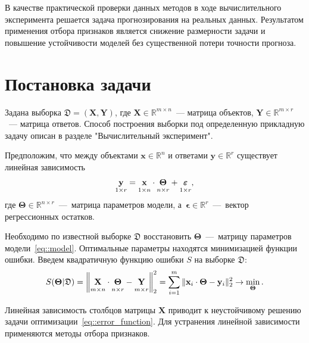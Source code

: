 \documentclass[12pt,twoside]{article}
\newcommand{\bx}{\mathbf{x}}
\newcommand{\by}{\mathbf{y}}
\newcommand{\bY}{\mathbf{Y}}
\newcommand{\bX}{\mathbf{X}}
\newcommand{\bQ}{\mathbf{Q}}
\newcommand{\bTheta}{\boldsymbol{\Theta}}
\begin{document}
В качестве практической проверки данных методов в ходе вычислительного эксперимента решается задача прогнозирования на реальных данных.
Результатом применения отбора признаков является снижение размерности задачи и повышение устойчивости моделей без существенной потери точности прогноза.
 

\section{Постановка задачи}
Задана выборка $\mathfrak{D}= \left( \bX, \bY \right)$, где $\mathbf{X} \in \mathbb{R}^{m \times n}$~--- матрица объектов, $\mathbf{Y} \in \mathbb{R}^{m \times r}$~--- матрица ответов. 
Способ построения выборки под определенную прикладную задачу описан в разделе "Вычислительный эксперимент".

Предположим, что между объектами $\bx \in \mathbb{R}^n$ и ответами $\by \in \mathbb{R}^r$ существует линейная зависимость 
\begin{equation}
\underset{1 \times r}{\vphantom{\bQ}\by} 
 = \underset{1 \times n}{\vphantom{\bQ}\bx} \cdot \underset{n \times r}{\vphantom{\bQ}\bTheta} + \underset{1 \times r}{\vphantom{\bQ}\boldsymbol{\epsilon}}, 
\label{eq::model}
\end{equation}
где $\bTheta \in \mathbb{R}^{n \times r}$~---~матрица параметров модели, а~$\boldsymbol{\epsilon}\in \mathbb{R}^{r}$~---~вектор регрессионных остатков.

Необходимо по известной выборке $\mathfrak{D}$ восстановить $\bTheta$~---~матрицу параметров модели~\eqref{eq::model}.
Оптимальные параметры находятся минимизацией функции ошибки.
Введем квадратичную функцию ошибки $S$ на выборке $\mathfrak{D}$:
\begin{equation}
	S(\bTheta | \mathfrak{D}) = {\left\| \underset{m \times n}{\vphantom{\bQ}\bX} \cdot \underset{n \times r}{\vphantom{\bQ}\bTheta} - \underset{m \times r}{\vphantom{\bQ}\bY} \right\| }_2^2 = \sum_{i=1}^m \| \bx_i \cdot \bTheta - \by_i\|_2^2 \rightarrow\min_{\bTheta}.
\label{eq::error_function}
\end{equation}
 
Линейная зависимость столбцов матрицы $\bX$ приводит к неустойчивому решению задачи оптимизации~\eqref{eq::error_function}. Для устранения линейной зависимости применяются методы отбора признаков.
\end{document}
